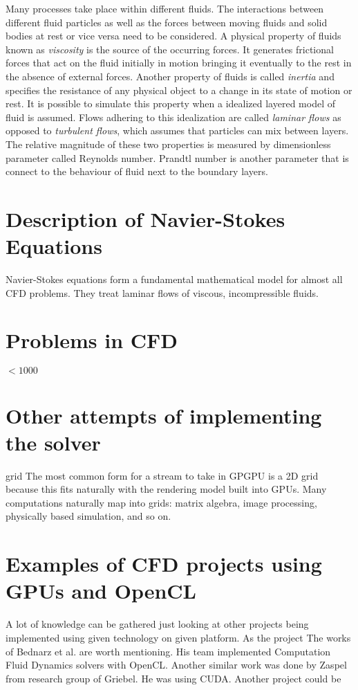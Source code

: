 Many processes take place within different fluids. The interactions between different fluid particles as well as the forces between moving fluids and solid bodies at rest or vice versa need to be considered. A physical property of fluids known as \emph{viscosity} is the source of the occurring forces. It generates frictional forces that act on the fluid initially in motion bringing it eventually to the rest in the absence of external forces. Another property of fluids is called \emph{inertia} and specifies the resistance of any physical object to a change in its state of motion or rest. It is possible to simulate this property when a idealized layered model of fluid is assumed. Flows adhering to this idealization are called \emph{laminar flows} as opposed to \emph{turbulent flows}, which assumes that particles can mix between layers. The relative magnitude of these two properties is measured by dimensionless parameter called Reynolds number. Prandtl number is another parameter that is connect to the behaviour of fluid next to the boundary layers.  

\section{Description of Navier-Stokes Equations}
Navier-Stokes equations form a fundamental mathematical model for almost all CFD problems. They treat laminar flows of viscous, incompressible fluids.

\section{Problems in CFD}


 $< 1000$

\section{Other attempts of implementing the solver}

grid The most common form for a stream to take in GPGPU is a 2D grid because this fits naturally with the rendering model built into GPUs. Many computations naturally map into grids: matrix algebra, image processing, physically based simulation, and so on.

\section{Examples of CFD projects using GPUs and OpenCL}
A lot of knowledge can be gathered just looking at other projects being implemented using given technology on given platform. As the project  The works of Bednarz et al. are worth mentioning. His team implemented Computation Fluid Dynamics solvers with OpenCL. Another similar work was done by Zaspel from research group of Griebel. He was using CUDA. Another project could be 

